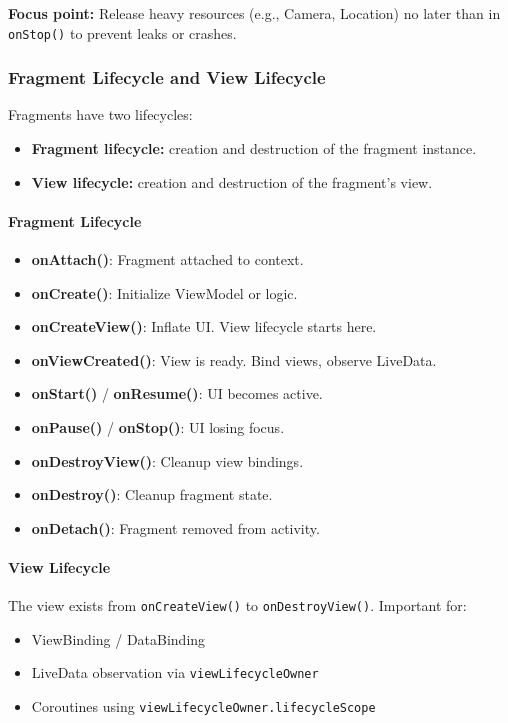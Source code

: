 \documentclass[a4paper,12pt]{article}
\begin{document}
\textbf{Focus point:} Release heavy resources (e.g., Camera, Location) no later than in \texttt{onStop()} to prevent leaks or crashes.


\subsubsection{Fragment Lifecycle and View Lifecycle}

Fragments have two lifecycles:
\begin{itemize}
  \item \textbf{Fragment lifecycle:} creation and destruction of the fragment instance.
  \item \textbf{View lifecycle:} creation and destruction of the fragment’s view.
\end{itemize}

\paragraph{Fragment Lifecycle}
\begin{itemize}
  \item \textbf{onAttach()}: Fragment attached to context.
  \item \textbf{onCreate()}: Initialize ViewModel or logic.
  \item \textbf{onCreateView()}: Inflate UI. View lifecycle starts here.
  \item \textbf{onViewCreated()}: View is ready. Bind views, observe LiveData.
  \item \textbf{onStart()} / \textbf{onResume()}: UI becomes active.
  \item \textbf{onPause()} / \textbf{onStop()}: UI losing focus.
  \item \textbf{onDestroyView()}: Cleanup view bindings.
  \item \textbf{onDestroy()}: Cleanup fragment state.
  \item \textbf{onDetach()}: Fragment removed from activity.
\end{itemize}

\paragraph{View Lifecycle}

The view exists from \texttt{onCreateView()} to \texttt{onDestroyView()}. Important for:

\begin{itemize}
  \item ViewBinding / DataBinding
  \item LiveData observation via \texttt{viewLifecycleOwner}
  \item Coroutines using \texttt{viewLifecycleOwner.lifecycleScope}
\end{itemize}
\end{document}
